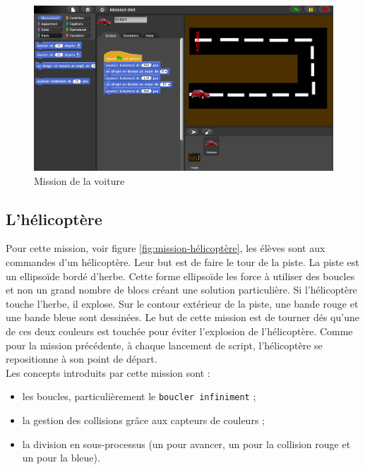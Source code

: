 \begin{figure}
  \begin{center}
    \includegraphics[width=\textwidth]{content/7-solution/1-missions/images/voiture}
    \caption{Mission de la voiture}
    \label{fig:mission-voiture}
  \end{center}
\end{figure}


\subsection{L'hélicoptère}
\label{mission-helicoptere}
Pour cette \gls{mission}, voir figure \ref{fig:mission-hélicoptère}, les élèves sont aux commandes d'un hélicoptère. Leur but est de faire le tour de la piste. La piste est un ellipsoïde bordé d'herbe. Cette forme ellipsoïde les force à utiliser des boucles et non un grand nombre de \glspl{bloc} créant une solution particulière. Si l'hélicoptère touche l'herbe, il explose. Sur le contour extérieur de la piste, une bande rouge et une bande bleue sont dessinées. Le but de cette \gls{mission} est de tourner dés qu'une de ces deux couleurs est touchée pour éviter l'explosion de l'hélicoptère. Comme pour la \gls{mission} précédente, à chaque lancement de \gls{script}, l'hélicoptère se repositionne à son point de départ.\\

Les concepts introduits par cette \gls{mission} sont :
\begin{itemize}
\item les boucles, particulièrement le \texttt{boucler infiniment} ;
\item la gestion des collisions grâce aux capteurs de couleurs ;
\item la division en sous-processus (un pour avancer, un pour la collision rouge et un pour la bleue).
\end{itemize}

